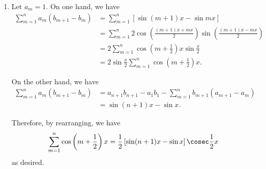 \begin{enumerate}
    \item Let \(a_m = 1\). On one hand, we have
          \begin{align*}
              \sum_{m = 1}^{n} a_m (b_{m + 1} - b_m) & = \sum_{m = 1}^{n} \left[\sin(m + 1) x - \sin mx\right]                                                  \\
                                                     & = \sum_{m = 1}^{n} 2 \cos \left(\frac{(m + 1)x + mx}{2}\right) \sin \left(\frac{(m + 1)x - mx}{2}\right) \\
                                                     & = 2 \sum_{m = 1}^{n} \cos \left(m + \frac{1}{2}\right)x \sin \frac{x}{2}                                 \\
                                                     & = 2 \sin \frac{x}{2} \sum_{m = 1}^{n} \cos \left(m + \frac{1}{2}\right)x.
          \end{align*}

          On the other hand, we have
          \begin{align*}
              \sum_{m = 1}^{n} a_m (b_{m + 1} - b_m) & = a_{n + 1} b_{n + 1} - a_1 b_1 - \sum_{m = 1}^{n} b_{m + 1} (a_{m + 1} - a_m) \\
                                                     & = \sin (n + 1) x - \sin x.
          \end{align*}

          Therefore, by rearranging, we have
          \[
              \sum_{m = 1}^{n} \cos \left(m + \frac{1}{2}\right)x = \frac{1}{2} \left[\sin(n + 1)x - \sin x\right] \cosec \frac{1}{2} x
          \]
          as desired.


\end{enumerate}
